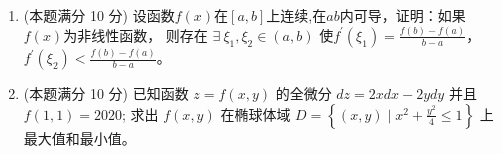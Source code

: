 \begin{enumerate}
\item 
(本题满分 10 分)
设函数$ f(x) $在$ [a,b] $上连续,在$ ab $内可导，证明：如果$ f(x) $为非线性函数，
则存在 $\exists \ \xi_{1}, \xi_{2} \in(a, b)$ 使$f^{\prime}(\xi_{1})=\frac{f(b)-f(a)}{b-a}$，$f^{\prime}\left(\xi_{2}\right)<\frac{f(b)-f(a)}{b-a}$。




\item 
(本题满分 10 分)
已知函数 $z=f(x, y)$ 的全微分 $d z=2 x d x-2 y d y$ 并且 $f(1,1)=2020$; 求出
$f(x, y)$ 在椭球体域 $D=\left\{(x, y) \mid x^{2}+\frac{y^{2}}{4} \leq 1\right\}$ 上最大值和最小值。




	
	
	
\end{enumerate}


